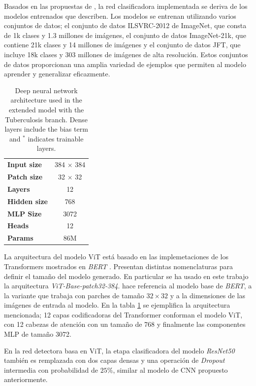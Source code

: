 {Basados en las propuestas de \citeauthor{DBLP:journals/corr/abs-2010-11929}, la red clasificadora
implementada se deriva de los modelos entrenados que describen. Los modelos se entrenan utilizando
varios conjuntos de datos; el conjunto de datos ILSVRC-2012 de ImageNet, que consta de 1k clases y
1.3 millones de imágenes, el conjunto de datos ImageNet-21k, que contiene 21k clases y 14 millones
de imágenes y el conjunto de datos JFT, que incluye 18k clases y 303 millones de imágenes de alta
resolución. Estos conjuntos de datos proporcionan una amplia variedad de ejemplos que permiten al
modelo aprender y generalizar eficazmente.

\begin{table}[!ht]
    \centering
    \begin{tabular}{| l | c |}
     \hline
    \textbf{Input size}  & 384 $\times$ 384 \\
    \textbf{Patch size}  & 32 $\times$ 32 \\
    \textbf{Layers}      & 12  \\
    \textbf{Hidden size} & 768 \\
    \textbf{MLP Size}    & 3072 \\
    \textbf{Heads}       & 12 \\
    \textbf{Params}      & 86M \\
     \hline
    \end{tabular}
    \caption{Deep neural network architecture used in the extended model with the Tuberculosis branch. Dense layers include the bias term and $^\ast$ indicates trainable layers.}
\label{table_ViTBase}
\end{table}

La arquitectura del modelo ViT está basado en las implemetaciones de los Transformers
mostrados en \textit{BERT} \cite{DBLP:journals/corr/abs-1810-04805}. Presentan distintas nomenclaturas
para definir el tamaño del modelo generado. En particular se ha usado en este trabajo la arquitectura
\textit{ViT-Base-patch32-384}.  hace referencia al modelo base de
\textit{BERT},  a la variante que trabaja con parches de tamaño $32 \times 32$ y
 a la dimensiones de las imágenes de entrada al modelo. En la tabla \ref{table_ViTBase}
se ejemplifica la arquitectura mencionada; 12 capas codificadoras del Transformer conforman el modelo
ViT, con 12 cabezas de atención con un tamaño de 768 y finalmente las componentes MLP de tamaño 3072.

En la red detectora basa en ViT, la etapa clasificadora del modelo \textit{ResNet50} también es
remplazada con dos capas densas y una operación de \textit{Dropout} intermedia con probabilidad
de $25\%$, similar al modelo de CNN propuesto anteriormente.

}
